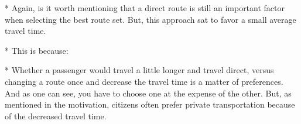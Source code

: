 \begin{enumerate}[label=\textbf{\arabic*})]
\begin{enumerate}
    * Again, is it worth mentioning that a direct route is still an important factor when selecting the best route set. But, this approach sat to favor a small average travel time.

    * This is because:

    * Whether a passenger would travel a little longer and travel direct, versus changing a route once and decrease the travel time is a matter of preferences. And as one can see, you have to choose one at the expense of the other. But, as mentioned in the motivation, citizens often prefer private transportation because of the decreased travel time. 

    \end{enumerate}
\end{enumerate}